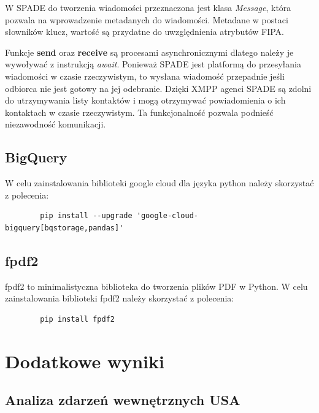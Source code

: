 \documentclass[11pt]{report}
\begin{document}
    W SPADE do tworzenia wiadomości przeznaczona jest klasa \textit{Message},
    która pozwala na wprowadzenie metadanych do wiadomości.
    Metadane w postaci słowników klucz, wartość są przydatne do uwzględnienia atrybutów FIPA\@.

    Funkcje \textbf{send} oraz \textbf{receive} są procesami asynchronicznymi dlatego należy je wywoływać z instrukcją \textit{await}.
    Ponieważ SPADE jest platformą do przesyłania wiadomości w czasie rzeczywistym,
    to wysłana wiadomość przepadnie jeśli odbiorca nie jest gotowy na jej odebranie.
    Dzięki XMPP agenci SPADE są zdolni do utrzymywania listy kontaktów i mogą otrzymywać powiadomienia o ich kontaktach w czasie rzeczywistym.
    Ta funkcjonalność pozwala podnieść niezawodność komunikacji.


    \section{BigQuery}
    W celu zainstalowania biblioteki google cloud dla języka python należy skorzystać z polecenia:
    \begin{verbatim}
        pip install --upgrade 'google-cloud-bigquery[bqstorage,pandas]'
    \end{verbatim}


    \section{fpdf2}
    fpdf2 to minimalistyczna biblioteka do tworzenia plików PDF w Python.
    W celu zainstalowania biblioteki fpdf2 należy skorzystać z polecenia:
    \begin{verbatim}
        pip install fpdf2
    \end{verbatim}


    \chapter{Dodatkowe wyniki}


    \section{Analiza zdarzeń wewnętrznych USA}
\end{document}
